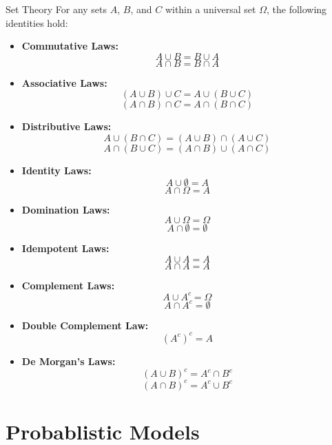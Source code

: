 \begin{identitiesboxbreak}{Set Theory}
For any sets \( A \), \( B \), and \( C \) within a universal set \( \Omega \), the following identities hold:
\begin{itemize}
    \item \textbf{Commutative Laws:}
    \[ A \cup B = B \cup A \]
    \[ A \cap B = B \cap A \]
    \item \textbf{Associative Laws:}
    \[ (A \cup B) \cup C = A \cup (B \cup C) \]
    \[ (A \cap B) \cap C = A \cap (B \cap C) \]
    \item \textbf{Distributive Laws:}
    \[ A \cup (B \cap C) = (A \cup B        ) \cap (A \cup C) \]
    \[ A \cap (B \cup C) = (A \cap B) \cup (A \cap C) \]
    \item \textbf{Identity Laws:}
    \[ A \cup \emptyset = A \]
    \[ A \cap \Omega = A \]
    \item \textbf{Domination Laws:}
    \[ A \cup \Omega = \Omega \]        
    \[ A \cap \emptyset = \emptyset \]      
    \item \textbf{Idempotent Laws:}
    \[ A \cup A = A \]
    \[ A \cap A = A \]
    \item \textbf{Complement Laws:}
    \[ A \cup A^c = \Omega \]
    \[ A \cap A^c = \emptyset \]
    \item \textbf{Double Complement Law:}
    \[ (A^c)^c = A \]
    \item \textbf{De Morgan's Laws:}
    \[ (A \cup B)^c = A^c \cap B^c \]
    \[ (A \cap B)^c = A^c \cup B^c \]
\end{itemize}
\end{identitiesboxbreak}

\section{Probablistic Models}

